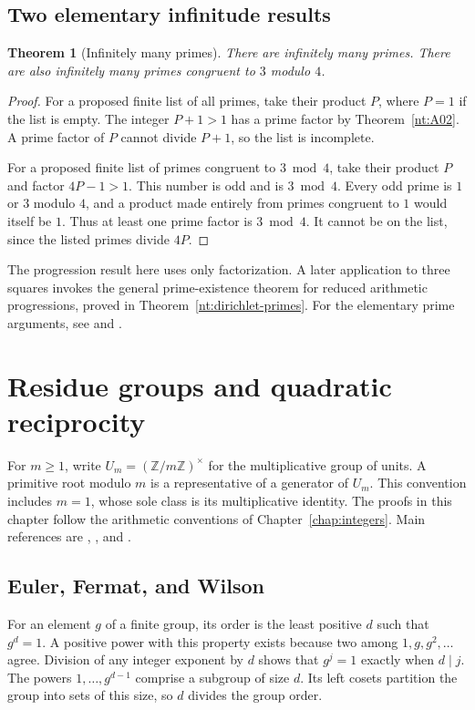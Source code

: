 \documentclass[11pt,oneside,openany]{book}
\theoremstyle{plain}
\newtheorem{theorem}{Theorem}[chapter]
\theoremstyle{definition}
\theoremstyle{remark}
\begin{document}
\section{Two elementary infinitude results}

\begin{theorem}[Infinitely many primes]\label{nt:A06}
There are infinitely many primes. There are also infinitely many
primes congruent to $3$ modulo $4$.
\end{theorem}
\begin{proof}
For a proposed finite list of all primes, take their product $P$,
where $P=1$ if the list is empty. The integer $P+1>1$ has a prime
factor by Theorem~\ref{nt:A02}. A prime factor of $P$ cannot
divide $P+1$, so the list is incomplete.

For a proposed finite list of primes congruent to $3\bmod4$,
take their product $P$ and factor $4P-1>1$. This number is odd
and is $3\bmod4$. Every odd prime is $1$ or $3$ modulo $4$, and
a product made entirely from primes congruent to $1$ would itself
be $1$. Thus at least one prime factor is $3\bmod4$. It cannot
be on the list, since the listed primes divide $4P$.
\end{proof}
The progression result here uses only factorization. A later
application to three squares invokes the general prime-existence
theorem for reduced arithmetic progressions, proved in
Theorem~\ref{nt:dirichlet-primes}.
For the elementary prime arguments, see \cite[Chs.~I and II]{hardy-wright}
and \cite[\S\S1.4, 1.6, 7.2]{apostol}.
\chapter{Residue groups and quadratic reciprocity}
\label{chap:congruences}

For $m\ge1$, write $U_m=(\mathbb Z/m\mathbb Z)^\times$ for the
multiplicative group of units. A primitive root modulo $m$ is a
representative of a generator of $U_m$. This convention includes
$m=1$, whose sole class is its multiplicative identity. The
proofs in this chapter follow the arithmetic conventions of
Chapter~\ref{chap:integers}. Main references are
\cite[Chs.~5, 9, 10]{apostol},
\cite[Chs.~2 and 3]{nzm}, and \cite[Ch.~12]{shoup}.

\section{Euler, Fermat, and Wilson}

For an element $g$ of a finite group, its order is the least positive
$d$ such that $g^d=1$. A positive power with this property exists
because two among $1,g,g^2,\ldots$ agree. Division of any integer
exponent by $d$ shows that $g^j=1$ exactly when $d\mid j$.
The powers $1,\ldots,g^{d-1}$ comprise a subgroup of size $d$.
Its left cosets partition the group into sets of this size, so
$d$ divides the group order.
\end{document}
